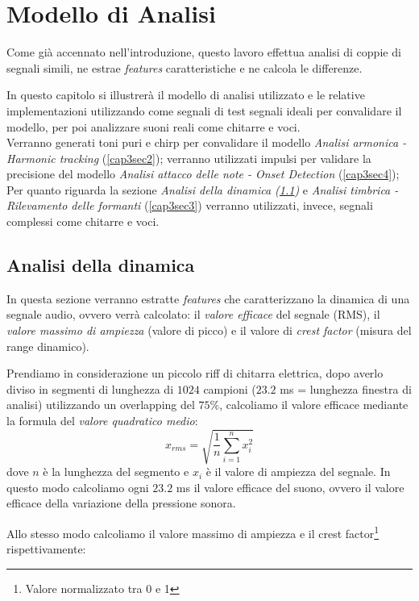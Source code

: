 \documentclass[12pt]{report}
\begin{document}
\chapter{Modello di Analisi}
\label{cap3}
	Come già accennato nell'introduzione, questo lavoro effettua analisi di coppie di segnali simili, ne estrae {\itshape features} caratteristiche e ne calcola le differenze.
	
	In questo capitolo si illustrerà il modello di analisi utilizzato e le relative implementazioni utilizzando come segnali di test segnali ideali per convalidare il modello, per poi analizzare suoni reali come chitarre e voci.\\
Verranno generati toni puri e chirp per convalidare il modello {\itshape Analisi armonica - Harmonic tracking} (\ref{cap3sec2}); verranno utilizzati impulsi per validare la precisione del modello {\itshape Analisi attacco delle note - Onset Detection} (\ref{cap3sec4}); Per quanto riguarda la sezione {\itshape Analisi della dinamica (\ref{cap3sec1})} e  {\itshape Analisi timbrica - Rilevamento delle formanti} (\ref{cap3sec3}) verranno utilizzati, invece, segnali complessi come chitarre e voci.\\

	\section{Analisi della dinamica}
	\label{cap3sec1}
	In questa sezione verranno estratte {\itshape features} che caratterizzano la dinamica di una segnale audio, ovvero verrà calcolato: il {\itshape valore efficace} del segnale (RMS), il {\itshape valore massimo di ampiezza} (valore di picco) e il valore di {\itshape crest factor} (misura del range dinamico).

Prendiamo in considerazione un piccolo riff di chitarra elettrica, dopo averlo diviso in segmenti di lunghezza di $1024$ campioni ($23.2$ ms = lunghezza finestra di analisi) utilizzando un overlapping del $75\%$, calcoliamo il valore efficace mediante la formula del {\itshape valore quadratico medio}:
\clearpage
$$ x_{rms} = \sqrt{\frac{1}{n}\sum_{i=1}^n x_i^2}$$
dove $n$ è la lunghezza del segmento e $x_i$ è il valore di ampiezza del segnale.
In questo modo calcoliamo ogni $23.2$ ms il valore efficace del suono, ovvero il valore efficace della variazione della pressione sonora.

Allo stesso modo calcoliamo il valore massimo di ampiezza e il crest factor\footnote{Valore normalizzato tra 0 e 1} rispettivamente:
\end{document}
